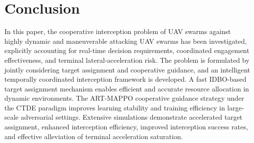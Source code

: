 \documentclass[lettersize,journal]{IEEEtran}
\newcommand{\hladd}[1]{{\color{blue}#1}}
\begin{document}

\section{Conclusion}
\label{sec:conclusion}

In this paper, the cooperative interception problem of UAV swarms against highly dynamic and
maneuverable attacking UAV swarms has been investigated, explicitly accounting for real-time
decision requirements, coordinated engagement effectiveness, and terminal lateral-acceleration risk.
The problem is formulated by jointly considering target assignment and cooperative guidance,
and an intelligent temporally coordinated interception framework is developed.
A fast IDBO-based target assignment mechanism enables efficient and accurate resource
allocation in dynamic environments.
The ART-MAPPO cooperative guidance strategy under the CTDE paradigm improves learning
stability and training efficiency in large-scale adversarial settings.
Extensive simulations demonstrate accelerated target assignment, enhanced interception efficiency, improved
interception success rates, and effective alleviation of terminal acceleration saturation.
\end{document}
